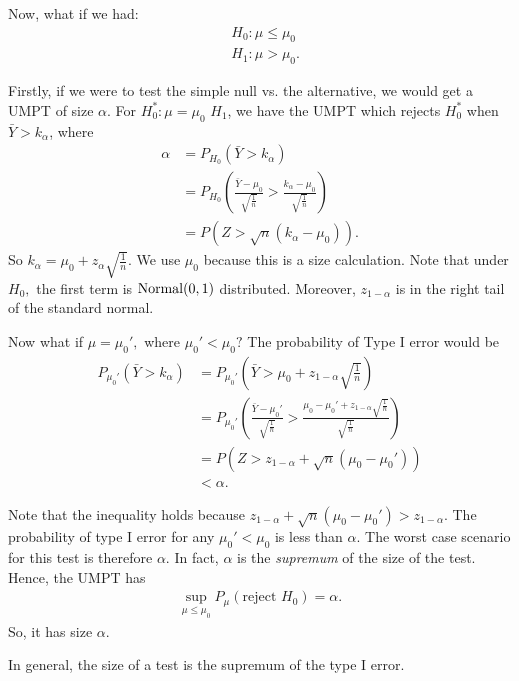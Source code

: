 \begin{eg}
\label{eg:NormalUMPT}
Now, what if we had:
\begin{align*}
	&H_0: \mu\leq \mu_0 \\
	&H_1:\mu>\mu_0
.\end{align*}

Firstly, if we were to test the simple null vs. the alternative, we would get a UMPT of size $\alpha$. For $H_0^*:\mu=\mu_0$  $H_1$, we have the UMPT which rejects $H_0^*$ when $\bar{Y}>k_\alpha$, where 
\begin{align*}
	\alpha&=P_{H_0}(\bar{Y}>k_\alpha)\\
	      &=P_{H_0}\left( \frac{\bar{Y}-\mu_0}{\sqrt{\frac{1}{n}}} > \frac{k_\alpha-\mu_0}{\sqrt{\frac{1}{n}}}  \right)\\
	      &= P(Z>\sqrt{n}(k_\alpha-\mu_0)) 
.\end{align*}  
So $k_\alpha=\mu_0+z_\alpha\sqrt{\frac{1}{n}}$.
We use $\mu_0$ because this is a size calculation. Note that under $H_0,$ the first term is $\operatorname*{Normal}(0,1)$ distributed. 
Moreover, $z_{1-\alpha}$ is in the right tail of the standard normal.


Now what if $\mu=\mu_0',$ where $\mu_0'<\mu_0?$ The probability of Type I error would be 
\begin{align*}
	P_{\mu_0'}(\bar{Y}>k_{\alpha}) 
	&=P_{\mu_0'}\left(\bar{Y}>\mu_0+z_{1-\alpha}\sqrt{\frac{1}{n}}\right) \\
	&=P_{\mu_0'}\left(\frac{\bar{Y}-\mu_0'}{\sqrt{\frac{1}{n}}} >\frac{\mu_0-\mu_0'+z_{1-\alpha}\sqrt{\frac{1}{n}}}{\sqrt{\frac{1}{n}}}\right)\\ 
	&=P(Z>z_{1-\alpha}+\sqrt{n} (\mu_0-\mu_0') ) \\
	&<\alpha.
\end{align*}

Note that the inequality holds because $z_{1-\alpha}+\sqrt{n} (\mu_0-\mu_0') > z_{1-\alpha}$. The probability of type I error for any $\mu_0'<\mu_0$ is less than $\alpha.$ The worst case scenario for this test is therefore $\alpha$. In fact,  $\alpha$ is the \textit{supremum} of the size of the test. Hence, the UMPT has
\begin{align*}
	\sup_{\mu\leq \mu_0}P_\mu(\text{reject } H_0)=\alpha
.\end{align*}
So, it has size $\alpha.$ 
\end{eg}

\begin{recall}
	In general, the size of a test is the supremum of the type I error.
\end{recall}	

